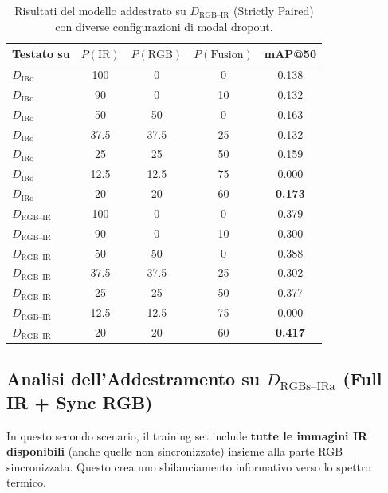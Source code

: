 \documentclass[a4paper,12pt]{article}
\begin{document}
\begin{table}[H]
\centering
\caption{Risultati del modello addestrato su $D_{\text{RGB--IR}}$ (Strictly Paired) con diverse configurazioni di modal dropout.}
\label{tab:rgb_ir_paired}
\begin{tabular}{lcccc}
\toprule
Testato su & $P(\text{IR})$ & $P(\text{RGB})$ & $P(\text{Fusion})$ & mAP@50 \\
\midrule
$D_{\text{IRo}}$ & 100 & 0 & 0 & 0.138 \\
$D_{\text{IRo}}$ & 90 & 0 & 10 & 0.132 \\
$D_{\text{IRo}}$ & 50 & 50 & 0 & 0.163 \\
$D_{\text{IRo}}$ & 37.5 & 37.5 & 25 & 0.132 \\
$D_{\text{IRo}}$ & 25 & 25 & 50 & 0.159 \\
$D_{\text{IRo}}$ & 12.5 & 12.5 & 75 & 0.000 \\
$D_{\text{IRo}}$ & 20 & 20 & 60 & \textbf{0.173} \\
\midrule
$D_{\text{RGB--IR}}$ & 100 & 0 & 0 & 0.379 \\
$D_{\text{RGB--IR}}$ & 90 & 0 & 10 & 0.300 \\
$D_{\text{RGB--IR}}$ & 50 & 50 & 0 & 0.388 \\
$D_{\text{RGB--IR}}$ & 37.5 & 37.5 & 25 & 0.302 \\
$D_{\text{RGB--IR}}$ & 25 & 25 & 50 & 0.377 \\
$D_{\text{RGB--IR}}$ & 12.5 & 12.5 & 75 & 0.000 \\
$D_{\text{RGB--IR}}$ & 20 & 20 & 60 & \textbf{0.417} \\
\bottomrule
\end{tabular}
\end{table}

\newpage


\subsection{Analisi dell'Addestramento su \texorpdfstring{$D_{\text{RGBs--IRa}}$}{D\_RGBs-IRa} (Full IR + Sync RGB)}

In questo secondo scenario, il training set include \textbf{tutte le immagini IR disponibili} (anche quelle non sincronizzate) insieme alla parte RGB sincronizzata. Questo crea uno sbilanciamento informativo verso lo spettro termico.
\end{document}
